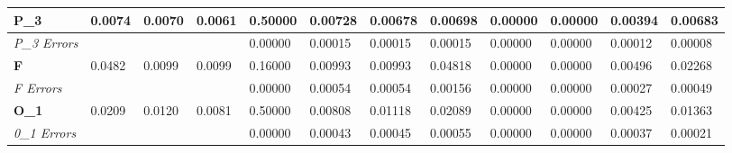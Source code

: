 \documentclass[]{scrartcl}
\begin{document}
\begin{table}[]
\begin{tabular}{|l|l|l|l|l|l|l|l|l|l|l|l|}
		\textbf{P\_3}                         & 0.0074                          & 0.0070                          & 0.0061                          & 0.50000                           & 0.00728                           & 0.00678                           & 0.00698                           & 0.00000                           & 0.00000                           & 0.00394                           & 0.00683                           \\ \hline
		\textit{P\_3 Errors}                           &                                 &                                 &                                 & 0.00000                           & 0.00015                           & 0.00015                           & 0.00015                           & 0.00000                           & 0.00000                           & 0.00012                           & 0.00008                           \\ \hline
		\textbf{F}                          & 0.0482                          & 0.0099                          & 0.0099                          & 0.16000                           & 0.00993                           & 0.00993                           & 0.04818                           & 0.00000                           & 0.00000                           & 0.00496                           & 0.02268                           \\ \hline
		\textit{F Errors}                           &                                 &                                 &                                 & 0.00000                           & 0.00054                           & 0.00054                           & 0.00156                           & 0.00000                           & 0.00000                           & 0.00027                           & 0.00049                           \\ \hline
		\textbf{O\_1}                         & 0.0209                          & 0.0120                          & 0.0081                          & 0.50000                           & 0.00808                           & 0.01118                           & 0.02089                           & 0.00000                           & 0.00000                           & 0.00425                           & 0.01363                           \\ \hline
		\textit{0\_1 Errors}
		&                                 &                                 &                                 & 0.00000                           & 0.00043                           & 0.00045                           & 0.00055                           & 0.00000                           & 0.00000                           & 0.00037                           & 0.00021                           \\ \hline

\end{tabular}
\end{table}
\end{document}
